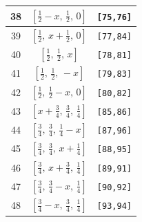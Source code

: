 \documentclass[fleqn,8pt]{jsarticle}
\begin{document}
\begin{longtable}{ccc}
38 & $\left[ \frac{1}{2} - x,\, \frac{1}{2},\, 0 \right]$ & {\tt [75,76]} \\ \hline
39 & $\left[ \frac{1}{2},\, x + \frac{1}{2},\, 0 \right]$ & {\tt [77,84]} \\ \hline
40 & $\left[ \frac{1}{2},\, \frac{1}{2},\, x \right]$ & {\tt [78,81]} \\ \hline
41 & $\left[ \frac{1}{2},\, \frac{1}{2},\, - x \right]$ & {\tt [79,83]} \\ \hline
42 & $\left[ \frac{1}{2},\, \frac{1}{2} - x,\, 0 \right]$ & {\tt [80,82]} \\ \hline
43 & $\left[ x + \frac{3}{4},\, \frac{3}{4},\, \frac{1}{4} \right]$ & {\tt [85,86]} \\ \hline
44 & $\left[ \frac{3}{4},\, \frac{3}{4},\, \frac{1}{4} - x \right]$ & {\tt [87,96]} \\ \hline
45 & $\left[ \frac{3}{4},\, \frac{3}{4},\, x + \frac{1}{4} \right]$ & {\tt [88,95]} \\ \hline
46 & $\left[ \frac{3}{4},\, x + \frac{3}{4},\, \frac{1}{4} \right]$ & {\tt [89,91]} \\ \hline
47 & $\left[ \frac{3}{4},\, \frac{3}{4} - x,\, \frac{1}{4} \right]$ & {\tt [90,92]} \\ \hline
48 & $\left[ \frac{3}{4} - x,\, \frac{3}{4},\, \frac{1}{4} \right]$ & {\tt [93,94]} \\
\end{longtable}
\renewcommand{\arraystretch}{1.2}
\end{document}
